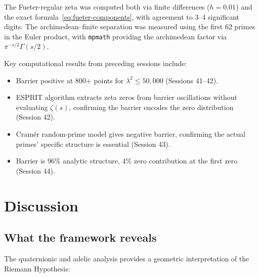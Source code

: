 \documentclass[11pt,a4paper]{article}
\theoremstyle{definition}
\begin{document}
The Fueter-regular zeta was computed both via finite differences ($h = 0.01$) and the exact formula~\eqref{eq:fueter-components}, with agreement to 3--4 significant digits. The archimedean--finite separation was measured using the first 62 primes in the Euler product, with \texttt{mpmath} providing the archimedean factor via $\pi^{-s/2}\Gamma(s/2)$.

Key computational results from preceding sessions include:
\begin{itemize}
\item Barrier positive at 800+ points for $\lambda^2 \le 50{,}000$ (Sessions 41--42).
\item ESPRIT algorithm extracts zeta zeros from barrier oscillations without evaluating $\zeta(s)$, confirming the barrier encodes the zero distribution (Session 42).
\item Cram\'er random-prime model gives negative barrier, confirming the actual primes' specific structure is essential (Session 43).
\item Barrier is $96\%$ analytic structure, $4\%$ zero contribution at the first zero (Session 44).
\end{itemize}

\section{Discussion}
\label{sec:discussion}

\subsection{What the framework reveals}

The quaternionic and adelic analysis provides a geometric interpretation of the Riemann Hypothesis:
\end{document}
